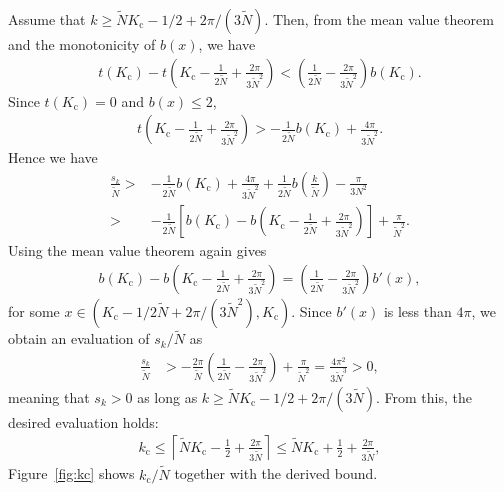 Assume that $k\geq\widetilde{N}K_{\mathrm{c}}-1/2+2\pi/(3\widetilde{N})$.
Then, from the mean value theorem and the monotonicity of $b(x)$, we have
\begin{align}
    t(K_{\mathrm{c}})-t\left(K_{\mathrm{c}}-\frac{1}{2\widetilde{N}}+\frac{2\pi}{3\widetilde{N}^{2}}\right)
    <\left(\frac{1}{2\widetilde{N}}-\frac{2\pi}{3\widetilde{N}^{2}}\right)b(K_{\mathrm{c}}).
\end{align}
Since $t(K_{\mathrm{c}})=0$ and $b(x)\leq 2$,
\begin{align}
    t\left(K_{\mathrm{c}}-\frac{1}{2\widetilde{N}}+\frac{2\pi}{3\widetilde{N}^{2}}\right)
    > -\frac{1}{2\widetilde{N}}b(K_{\mathrm{c}})+\frac{4\pi}{3\widetilde{N}^{2}}.
\end{align}
Hence we have
\begin{align}
    \frac{s_{k}}{\widetilde{N}}
    >& -\frac{1}{2\widetilde{N}}b(K_{\mathrm{c}})+\frac{4\pi}{3\widetilde{N}^{2}}
    +\frac{1}{2\widetilde{N}}b\left(\frac{k}{\widetilde{N}}\right)-\frac{\pi}{3N^{2}}\\
    >& -\frac{1}{2\widetilde{N}}\left[b(K_{\mathrm{c}})-b\left(K_{\mathrm{c}}-\frac{1}{2\widetilde{N}}+\frac{2\pi}{3\widetilde{N}^{2}}\right)\right]+\frac{\pi}{\widetilde{N}^{2}}.
\end{align}
Using the mean value theorem again gives
\begin{align}
    b(K_{\mathrm{c}})-b\left(K_{\mathrm{c}}-\frac{1}{2\widetilde{N}}+\frac{2\pi}{3\widetilde{N}^{2}}\right)=\left(\frac{1}{2\widetilde{N}}-\frac{2\pi}{3\widetilde{N}^{2}}\right)b'(x),
\end{align}
for some $x\in(K_{\mathrm{c}}-1/2\widetilde{N}+2\pi/(3\widetilde{N}^{2}),K_{\mathrm{c}})$.
Since $b'(x)$ is less than $4\pi$,
we obtain an evaluation of $s_{k}/\widetilde{N}$ as
\begin{align}
    \frac{s_{k}}{\widetilde{N}}&>-\frac{2\pi}{\widetilde{N}}\left(\frac{1}{2\widetilde{N}}-\frac{2\pi}{3\widetilde{N}^{2}}\right)
    +\frac{\pi}{\widetilde{N}^{2}}=\frac{4\pi^{2}}{3\widetilde{N}^{3}}>0,
\end{align}
meaning that $s_{k}>0$ as long as $k\geq\widetilde{N}K_{\mathrm{c}}-1/2+2\pi/(3\widetilde{N})$. From this, the desired evaluation holds:
\begin{align}
    k_{\mathrm{c}}\leq\left\lceil\widetilde{N}K_{\mathrm{c}}-\frac{1}{2}+\frac{2\pi}{3\widetilde{N}}\right\rceil
    \leq \widetilde{N}K_{\mathrm{c}}+\frac{1}{2}+\frac{2\pi}{3\widetilde{N}},
    \label{eq:kc_bound}
\end{align}
Figure~\ref{fig:kc} shows $k_{\mathrm{c}}/\widetilde{N}$ together with the derived bound.

